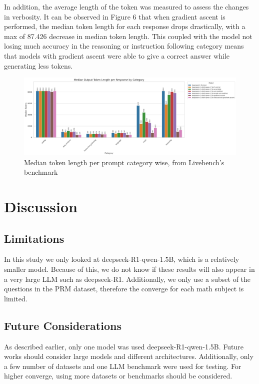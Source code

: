 \documentclass[10.5pt]{article}
\begin{document}
In addition, the average length of the token was measured to assess the changes in verbosity. It can be observed in Figure 6 that when gradient ascent is performed, the median token length for each response drops drastically, with a max of 87.426 decrease in median token length. This coupled with the model not losing much accuracy in the reasoning or instruction following category means that models with gradient ascent were able to give a correct answer while generating less tokens.
\begin{figure}[h]
    \centering
    \includegraphics[width=1\linewidth]{token_length_median_by_category.png}
    \caption{Median token length per prompt category wise, from Livebench's benchmark}
    \label{fig:enter-label}
\end{figure}


\section{Discussion}
\subsection{Limitations}
In this study we only looked at deepseek-R1-qwen-1.5B, which is a relatively smaller model. Because of this, we do not know if these results will also appear in a very large LLM such as deepseek-R1. Additionally, we only use a subset of the questions in the PRM dataset\cite{lightman2023lets}, therefore the converge for each math subject is limited.
\subsection{Future Considerations}
As described earlier, only one model was used deepseek-R1-qwen-1.5B. Future works should consider large models and different architectures. Additionally, only a few number of datasets and one LLM benchmark were used for testing. For higher converge, using more datasets or benchmarks should be considered.
\end{document}
